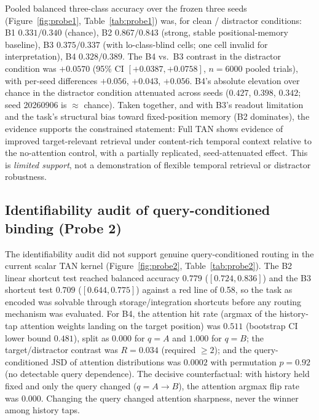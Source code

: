 Pooled balanced three-class accuracy over the frozen three seeds
(Figure~\ref{fig:probe1}, Table~\ref{tab:probe1}) was, for clean /
distractor conditions: B1 $0.331 / 0.340$ (chance), B2
$0.867 / 0.843$ (strong, stable positional-memory baseline), B3
$0.375 / 0.337$ (with lo-class-blind cells; one cell invalid for
interpretation), B4 $0.328 / 0.389$.  The B4 vs.\ B3 contrast in the
distractor condition was $+0.0570$ (95\% CI $[+0.0387, +0.0758]$,
$n = 6000$ pooled trials), with per-seed differences $+0.056$, $+0.043$,
$+0.056$.  B4's absolute elevation over chance in the distractor
condition attenuated across seeds ($0.427$, $0.398$, $0.342$;
seed 20260906 is $\approx$ chance).  Taken together, and with B3's
readout limitation and the task's structural bias toward fixed-position
memory (B2 dominates), the evidence supports the constrained statement:
Full TAN shows evidence of improved target-relevant retrieval under
content-rich temporal context relative to the no-attention control, with
a partially replicated, seed-attenuated effect.  This is \emph{limited
support}, not a demonstration of flexible temporal retrieval or
distractor robustness.

\subsection{Identifiability audit of query-conditioned binding (Probe 2)}
\label{sec:res-probe2}

The identifiability audit did not support genuine query-conditioned
routing in the current scalar TAN kernel (Figure~\ref{fig:probe2},
Table~\ref{tab:probe2}).  The B2 linear shortcut test reached balanced
accuracy $0.779$ ($[0.724, 0.836]$) and the B3 shortcut test $0.709$
($[0.644, 0.775]$) against a red line of 0.58, so the task as encoded
was solvable through storage/integration shortcuts before any routing
mechanism was evaluated.  For B4, the attention hit rate (argmax of the
history-tap attention weights landing on the target position) was $0.511$
(bootstrap CI lower bound $0.481$), split as $0.000$ for $q = A$ and
$1.000$ for $q = B$; the target/distractor contrast was $R = 0.034$
(required $\geq 2$); and the query-conditioned JSD of attention
distributions was $0.0002$ with permutation $p = 0.92$ (no detectable
query dependence).  The decisive counterfactual: with history held
fixed and only the query changed ($q = A \to B$), the attention argmax
flip rate was $0.000$.  Changing the query changed attention sharpness,
never the winner among history taps.

